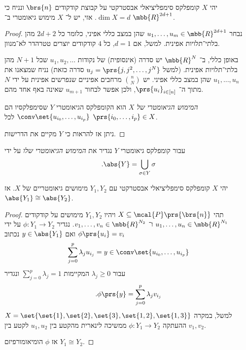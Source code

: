 \documentclass[a4paper,10pt,twoside,openany]{book}
\begin{document}
\begin{proposition}
יהי
$X$
קומפלקס סימפליציאלי אבסטרקטי על קבוצת קודקודים
$\brs{n}$
ונניח כי
$\dim X = d$.
אזי, יש ל־%
$X$
מימוש גיאומטרי ב־%
$\mbb{R}^{2d + 1}$.
\end{proposition}

\begin{proof}
נבחר
$u_1, \ldots, u_m \in \mbb{R}^{2d+1}$
שהן במצב כללי אפיני, כלומר כל
$2d + 2$
מהן בלתי־תלויות אפינית. למשל, אם
$d=1$,
כל
$4$
קודקודים יוצרים טטרהדר לא־מנוון.

באופן כללי, ב־%
$\mbb{R}^N$
יש סדרה (אינסופית) של נקודות
$u_1, u_2, \ldots$
שכל
$N+1$
מהן בלתי־תלויות אפינית. (למשל
$u_j = \prs{j, j^2, \ldots, j^N}$
סדרה כזאת)
נניח שמצאנו את
$u_1, \ldots, u_n$
שהן במצב כללי אפיני.
יש
$\binom{n}{N}$
מרחבים אפיניים שנפרשים אפינית על ידי
$N$
מתוך ה־%
$\prs{u_i}_{i \in [n]}$,
ולכן אפשר לבחור
$u_{m+1}$
שאינה באף אחד מהם.

\emph{המימוש הגיאומטרי של
$X$}
הוא הקומפלקס הגיאומטרי
$Y$
שסימפלקסיו הם
$\conv\set{u_{i_0}, \ldots, u_{i_p}}$
לכל
$\prs{i_0, \ldots, i_p} \in X$.

ניתן אז להראות כי
$Y$
מקיים את הדרישות.
\end{proof}

\begin{definition}
עבור קומפלקס גיאומטרי
$Y$
נגדיר את
\emph{המימוש הגיאומטרי שלו}
על ידי
\[\text{.} \abs{Y} = \bigcup_{\sigma \in Y} \sigma\]
\end{definition}

\begin{proposition}
יהי
$X$
קומפלקס סימפליציאלי אבסטרקטי עם
$Y_1, Y_2$
מימושים גיאומטריים של
$X$.
אז
$\abs{Y_1} \cong \abs{Y_2}$.
\end{proposition}

\begin{proof}
תהי
$X \subseteq \mcal{P}\prs{\brs{n}}$
ויהיו
$Y_1, Y_2$
מימושים על קודקודים
$u_1, \ldots, u_n \in \mbb{R}^{N_1}$
ו־%
$v_1, \ldots, v_n \in \mbb{R}^{N_2}$.
נגדיר
$\phi \colon Y_1 \to Y_2$
על ידי
$\phi\prs{u_i} = v_i$
ואם
$y \in \abs{Y_1}$
נכתוב
\begin{align*}
\sum_{j = 0}^p \lambda_j u_{i_j} = y \in \conv\set{u_{i_0}, \ldots, u_{i_p}}
\end{align*}
עבור
$\lambda_j \geq 0$
המקיימות
$\sum_{j=0}^p \lambda_j = 1$
ונגדיר
\[\text{.} \phi\prs{y} = \sum_{j=0}^p \lambda_j v_{i_j}\]
למשל, במקרה
$X = \set{\set{1}, \set{2}, \set{3}, \set{1,2}, \set{1,3}}$
ההעתקה
$\phi \colon Y_1 \to Y_2$
ממשיכה לינארית מהקטע בין
$u_1, u_2$
לקטע בין
$v_1, v_2$.

אז
$\phi$
הומיאומורפיזם
$Y_1 \cong Y_2$.
\end{proof}
\end{document}
